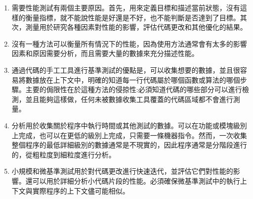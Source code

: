\begin{enumerate}
\item 
需要性能測試有兩個主要原因。首先，用來定義目標和描述當前狀態，沒有這樣的衡量指標，就不能說性能是好還是不好，也不能判斷是否達到了目標。其次，測量用於研究各種因素對性能的影響，評估代碼更改和其他優化的結果。

\item 
沒有一種方法可以衡量所有情況下的性能，因為使用方法通常會有太多的影響因素和原因需要分析，而且需要大量的數據來充分描述性能。

\item 
通過代碼的手工工具進行基準測試的優點是，可以收集想要的數據，並且很容易將數據放在上下文中，明確的知道每一行代碼屬於哪個函數或算法的哪個步驟。主要的侷限性在於這種方法的侵掠性:必須知道代碼的哪些部分可以進行檢測，並且能夠這樣做，任何未被數據收集工具覆蓋的代碼區域都不會進行測量。

\item
分析用於收集關於程序中執行時間或其他測試的數據。可以在功能或模塊級別上完成，也可以在更低的級別上完成，只需要一條機器指令。然而，一次收集整個程序的最低詳細級別的數據通常是不現實的，因此程序通常是分階段進行的，從粗粒度到細粒度進行分析。

\item
小規模和微基準測試用於對代碼更改進行快速迭代，並評估它們對性能的影響。還可以用於詳細分析小代碼片段的性能。必須確保微基準測試中的執行上下文與實際程序的上下文儘可能相似。
	
\end{enumerate}